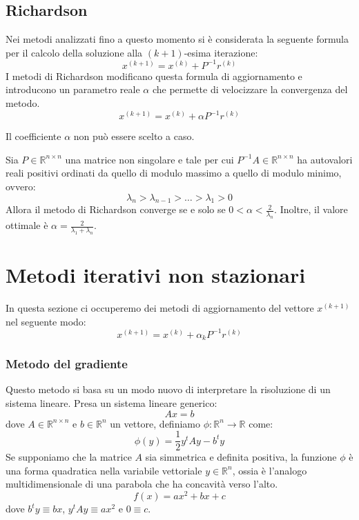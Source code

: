 \subsection{Richardson}
Nei metodi analizzati fino a questo momento si è considerata la seguente formula
per il calcolo della soluzione alla $(k + 1)$-esima iterazione:
\begin{equation*}
    x^{(k + 1)} = x^{(k)} + P^{-1}r^{(k)}
\end{equation*}
I metodi di Richardson modificano questa formula di aggiornamento e introducono
un parametro reale $\alpha$ che permette di velocizzare la convergenza del metodo.
\begin{equation*}
    x^{(k + 1)} = x^{(k)} + \alpha P^{-1}r^{(k)}
\end{equation*}
\begin{nota}
    Il coefficiente $\alpha$ non può essere scelto a caso.
\end{nota}
\begin{teorema}
    Sia $P\in \mathbb{R}^{n \times n}$ una matrice non singolare e tale per cui
    $P^{-1}A \in \mathbb{R}^{n \times n}$ ha autovalori reali positivi ordinati
    da quello di modulo massimo a quello di modulo minimo, ovvero:
    \begin{equation*}
        \lambda_n >\lambda_{n-1} > \dots > \lambda_1 > 0
    \end{equation*}
    Allora il metodo di Richardson converge se e solo se $0 < \alpha < \frac{2}{\lambda_n}$.
    Inoltre, il valore ottimale è $\alpha = \frac{2}{\lambda_1+\lambda_n}$.
\end{teorema}
\section{Metodi iterativi non stazionari}
In questa sezione ci occuperemo dei metodi di aggiornamento del vettore $x^{(k + 1)}$
nel seguente modo:
\begin{equation*}
    x^{(k + 1)} = x^{(k)} + \alpha_{k}P^{-1}r^{(k)}
\end{equation*}
\subsubsection{Metodo del gradiente}
Questo metodo si basa su un modo nuovo di interpretare la risoluzione di un
sistema lineare. Presa un sistema lineare generico:
\begin{equation*}
    Ax = b
\end{equation*}
dove $A \in \mathbb{R}^{n \times n}$ e $b \in \mathbb{R}^n$ un vettore, definiamo
$\phi: \mathbb{R}^n \rightarrow \mathbb{R}$ come:
\begin{equation}
    \phi(y) = \frac{1}{2} y^t A y - b^t y
\end{equation}
Se supponiamo che la matrice $A$ sia simmetrica e definita positiva, la funzione
$\phi$ è una forma quadratica nella variabile vettoriale $y \in \mathbb{R}^n$,
ossia è l'analogo multidimensionale di una parabola che ha concavità verso l'alto.
\begin{equation*}
    f(x) = ax^2 + bx + c
\end{equation*}
dove $b^ty \equiv bx$, $y^tAy \equiv ax^2$ e $0\equiv c$.

